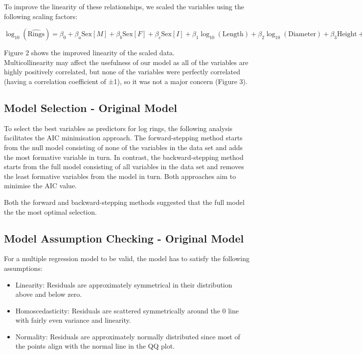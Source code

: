 \documentclass[a4paper,9pt,twocolumn,twoside,]{pinp}
\providecommand{\tightlist}{%
  \setlength{\itemsep}{0pt}\setlength{\parskip}{0pt}}
\begin{document}
To improve the linearity of these relationships, we scaled the variables
using the following scaling factors:

\(\log_{10}(\widehat{\text{Rings}}) = \beta_0 + \beta_a\text{Sex}[M] + \beta_b\text{Sex} [F] + \beta_c\text{Sex}[I] + \beta_1\log_{10}(\text{Length}) + \beta_2\log_{10}(\text{Diameter}) + \beta_3\text{Height} + \beta_4\log_{10}(\text{Whole Weight}) + \beta_5\log_{10}(\text{Shucked Weight}) + \beta_6\log_{10}(\text{Viscera Weight}) + \beta_7\log_{10}(\text{Shell Weight}) + \varepsilon_i\)

Figure 2 shows the improved linearity of the scaled data.\\

Multicollinearity may affect the usefulness of our model as all of the
variables are highly positively correlated, but none of the variables
were perfectly correlated (having a correlation coefficient of ±1), so
it was not a major concern (Figure 3).

\hypertarget{model-selection---original-model}{%
\subsection{Model Selection - Original
Model}\label{model-selection---original-model}}

To select the best variables as predictors for log rings, the following
analysis facilitates the AIC minimisation approach. The forward-stepping
method starts from the null model consisting of none of the variables in
the data set and adds the most formative variable in turn. In contrast,
the backward-stepping method starts from the full model consisting of
all variables in the data set and removes the least formative variables
from the model in turn. Both approaches aim to minimise the AIC value.

Both the forward and backward-stepping methods suggested that the full
model the the most optimal selection.

\hypertarget{model-assumption-checking---original-model}{%
\subsection{Model Assumption Checking - Original
Model}\label{model-assumption-checking---original-model}}

For a multiple regression model to be valid, the model has to satisfy
the following assumptions:

\begin{itemize}
\tightlist
\item
  Linearity: Residuals are approximately symmetrical in their
  distribution above and below zero.
\item
  Homoscedasticity: Residuals are scattered symmetrically around the 0
  line with fairly even variance and linearity.
\item
  Normality: Residuals are approximately normally distributed since most
  of the points align with the normal line in the QQ plot.
\end{itemize}
\end{document}
